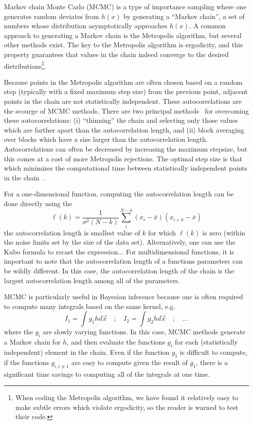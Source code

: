 Markov chain Monte Carlo (MCMC) is a type of
importance sampling where one generates random deviates from $h(x)$
by generating a ``Markov chain'', a set of numbers whose distribution
asymptotically approaches $h(x)$. A common approach to generating
a Markov chain is the Metropolis algorithm, but several other methods
exist. The key to the Metropolis algorithm is ergodicity, and this
property guarantees that values in the chain indeed converge to
the desired distributions\footnote{When coding the Metropolis algorithm, we
have found it relatively easy to make subtle errors which violate
ergodicity, so the reader is warned to test their code.}.

Because points in the Metropolis algorithm are often chosen based on a
random step (typically with a fixed maximum step size) from the
previous point, adjacent points in the chain are not statistically
independent. These autocorrelations are the scourge of MCMC methods.
There are two principal methods~\cite{Allen89} for overcoming these
autocorrelations: (i) ``thinning'' the chain and selecting only those
values which are farther apart than the autocorrelation length, and
(ii) block averaging over blocks which have a size larger than the
autocorrelation length. Autocorrelations can often be decreased
by increasing the maximum stepsize, but this comes at a cost of
more Metropolis rejections. The optimal step size is that which
minimizes the computational time between statistically independent
points in the chain~\cite{Sokal80}.

For a one-dimensional function, computing the autocorrelation length
can be done directly using the 
\begin{equation}
  \ell(k) = \frac{1}{\sigma^2(N-k)}
  \sum_i^{N-k} (x_i- \bar{x})(x_{i+k}- \bar{x})
\end{equation}
the autocorrelation length is smallest value of $k$ for which
$\ell(k)$ is zero (within the noise limits set by the size of the data
set). Alternatively, one can use the Kubo formula to
recast the expression...  For multidimensional functions, it is important to note that
the autocorrelation length of a functions parameters can be wildly
different. In this case, the autocorrelation length of the chain is
the largest autocorrelation length among all of the parameters.

MCMC is particularly useful in Bayesian inference because one is
often required to compute many integrals based on the same kernel,
e.g.
\begin{equation}
  I_1 = \int g_1 h d \vec{x} \quad ; \quad
  I_2 = \int g_2 h d \vec{x} \quad ; \quad \ldots
\end{equation}
where the $g_i$ are slowly varying functions. In this case, MCMC
methods generate a Markov chain for $h$, and then evaluate the
functions $g_i$ for each (statistically independent) element in the
chain. Even if the function $g_1$ is difficult to compute, 
if the functions $g_{i,i\neq 1}$ are easy to compute given the
result of $g_1$, there is a significant time savings to computing
all of the integrals at one time.



